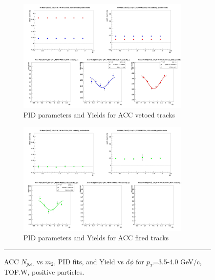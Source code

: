 \begin{figure}[H]
  \ContinuedFloat
    \begin{subfigure}{1\textwidth}
   \centering
   \includegraphics[width=0.94\textwidth]{hiptfits/pos/fitParams_tof2_cent0_ch1_pT-35-40.jpg}
    \caption{PID parameters and Yields for ACC vetoed tracks}
    \end{subfigure}    
    \begin{subfigure}{1\textwidth}
   \centering
   \includegraphics[width=0.94\textwidth]{hiptfits/pos/fitParams_tof3_cent0_ch1_pT-35-40.jpg}
    \caption{PID parameters and Yields for ACC fired tracks}
    \end{subfigure} 
    \rule{35em}{0.5pt}
  \caption[ACC $N_{p.e.}$ vs $m_2$, PID fits, and Yield vs $d\phi$ for $p_T$=3.5-4.0 GeV/c, TOF.W, positive particles.]{ACC $N_{p.e.}$ vs $m_2$, PID fits, and Yield vs $d\phi$ for $p_T$=3.5-4.0 GeV/c, TOF.W, positive particles.}
  \label{fig:acc35-40pos}
\end{figure}

